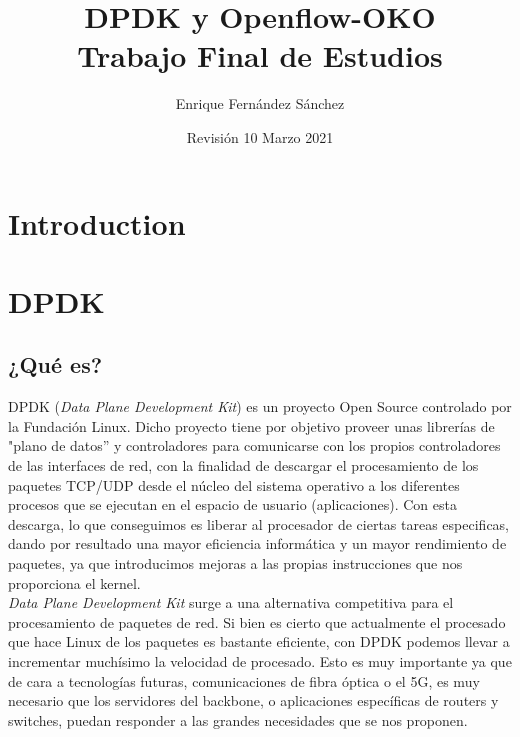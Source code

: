 \documentclass[12pt]{article}
\begin{document}
    \title{DPDK y Openflow-OKO \\ \large Trabajo Final de Estudios}
    \author{Enrique Fernández Sánchez}
    
    \date{Revisión 10 Marzo 2021}
    
    \maketitle
    \tableofcontents
    
    \pagebreak

    \section{Introduction}
    
    \pagebreak
    
    \section{DPDK}
    \subsection{¿Qué es?}
    \noindent DPDK (\emph{Data Plane Development Kit}) es un proyecto Open Source controlado por la Fundación Linux. Dicho proyecto tiene por objetivo proveer unas librerías de "plano de datos'' y controladores para comunicarse con los propios controladores de las interfaces de red, con la finalidad de descargar el procesamiento de los paquetes TCP/UDP desde el núcleo del sistema operativo a los diferentes procesos que se ejecutan en el espacio de usuario (aplicaciones). Con esta descarga, lo que conseguimos es liberar al procesador de ciertas tareas especificas, dando por resultado una mayor eficiencia informática y un mayor rendimiento de paquetes, ya que introducimos mejoras a las propias instrucciones que nos proporciona el kernel.\\
    
    \noindent \emph{Data Plane Development Kit} surge a una alternativa competitiva para el procesamiento de paquetes de red. Si bien es cierto que actualmente el procesado que hace Linux de los paquetes es bastante eficiente, con DPDK podemos llevar a incrementar muchísimo la velocidad de procesado. Esto es muy importante ya que de cara a tecnologías futuras, comunicaciones de fibra óptica o el 5G, es muy necesario que los servidores del backbone, o aplicaciones específicas de routers y switches, puedan responder a las grandes necesidades que se nos proponen.\\
    
\end{document}
